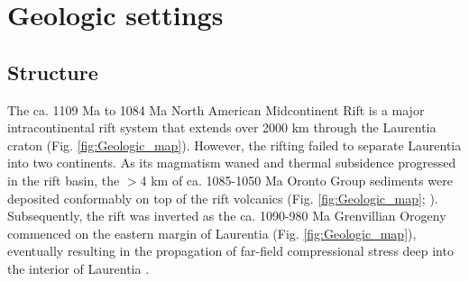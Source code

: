 \documentclass[draft]{agujournal2019}
\begin{document}



\section*{Geologic settings}

\subsection*{Structure}
The ca. 1109 Ma to 1084 Ma North American Midcontinent Rift is a major intracontinental rift system that extends over 2000 km through the Laurentia craton (Fig. \ref{fig:Geologic_map}). However, the rifting failed to separate Laurentia into two continents. As its magmatism waned and thermal subsidence progressed in the rift basin, the $>$4 km of ca. 1085-1050 Ma Oronto Group sediments \cite{Fairchild2017a, Swanson-Hysell2019a} were deposited conformably on top of the rift volcanics (Fig. \ref{fig:Geologic_map}; ). Subsequently, the rift was inverted as the ca. 1090-980 Ma Grenvillian Orogeny commenced on the eastern margin of Laurentia (Fig. \ref{fig:Geologic_map}), eventually resulting in the propagation of far-field compressional stress deep into the interior of Laurentia \cite{Cannon1993a, Cannon1994a}. 
\end{document}
